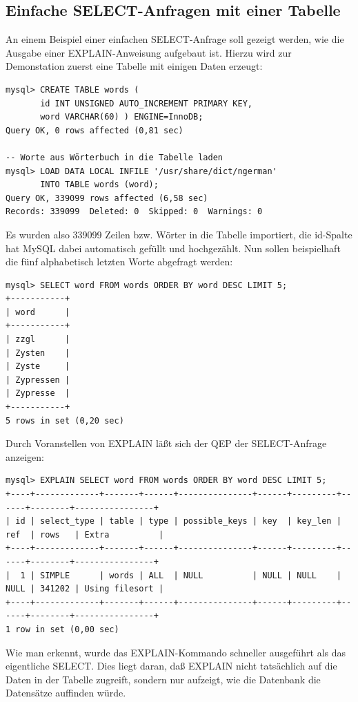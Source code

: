 \subsection{Einfache SELECT-Anfragen mit einer Tabelle}
An einem Beispiel einer einfachen SELECT-Anfrage soll gezeigt werden, wie die Ausgabe einer EXPLAIN-Anweisung aufgebaut ist.
Hierzu wird zur Demonstation zuerst eine Tabelle mit einigen Daten erzeugt:
\begin{lstlisting}
mysql> CREATE TABLE words ( 
       id INT UNSIGNED AUTO_INCREMENT PRIMARY KEY, 
       word VARCHAR(60) ) ENGINE=InnoDB; 
Query OK, 0 rows affected (0,81 sec)

-- Worte aus Wörterbuch in die Tabelle laden
mysql> LOAD DATA LOCAL INFILE '/usr/share/dict/ngerman'
       INTO TABLE words (word);
Query OK, 339099 rows affected (6,58 sec)
Records: 339099  Deleted: 0  Skipped: 0  Warnings: 0
\end{lstlisting}
Es wurden also 339099 Zeilen bzw. Wörter in die Tabelle importiert, die id-Spalte hat MySQL dabei automatisch gefüllt und hochgezählt.
Nun sollen beispielhaft die fünf alphabetisch letzten Worte abgefragt werden:
\begin{lstlisting}
mysql> SELECT word FROM words ORDER BY word DESC LIMIT 5;
+-----------+
| word      |
+-----------+
| zzgl      |
| Zysten    |
| Zyste     |
| Zypressen |
| Zypresse  |
+-----------+
5 rows in set (0,20 sec)
\end{lstlisting}
Durch Voranstellen von EXPLAIN läßt sich der QEP der SELECT-Anfrage anzeigen:
\begin{lstlisting}[basicstyle=\ttfamily\scriptsize]
mysql> EXPLAIN SELECT word FROM words ORDER BY word DESC LIMIT 5;
+----+-------------+-------+------+---------------+------+---------+------+--------+----------------+
| id | select_type | table | type | possible_keys | key  | key_len | ref  | rows   | Extra          |
+----+-------------+-------+------+---------------+------+---------+------+--------+----------------+
|  1 | SIMPLE      | words | ALL  | NULL          | NULL | NULL    | NULL | 341202 | Using filesort |
+----+-------------+-------+------+---------------+------+---------+------+--------+----------------+
1 row in set (0,00 sec)
\end{lstlisting}
Wie man erkennt, wurde das EXPLAIN-Kommando schneller ausgeführt als das eigentliche SELECT.
Dies liegt daran, daß EXPLAIN nicht tatsächlich auf die Daten in der Tabelle zugreift, sondern nur aufzeigt, wie die Datenbank die Datensätze auffinden würde.


